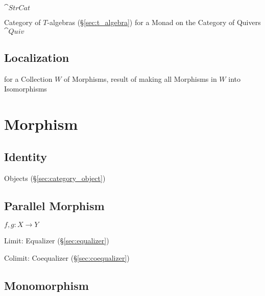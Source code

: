 $\cat{StrCat}$

Category of $T$-algebras (\S\ref{sec:t_algebra}) for a Monad on the
Category of Quivers $\cat{Quiv}$



\subsection{Localization}\label{sec:category_localization}

for a Collection $W$ of Morphisms, result of making all Morphisms in
$W$ into Isomorphisms




\section{Morphism}\label{sec:morphism}

\subsection{Identity}\label{sec:identity_morphism}

Objects (\S\ref{sec:category_object})



\subsection{Parallel Morphism}\label{sec:parallel_morphism}

$f,g : X \rightarrow Y$

Limit: Equalizer (\S\ref{sec:equalizer})

Colimit: Coequalizer (\S\ref{sec:coequalizer})



\subsection{Monomorphism}\label{sec:monomorphism}

